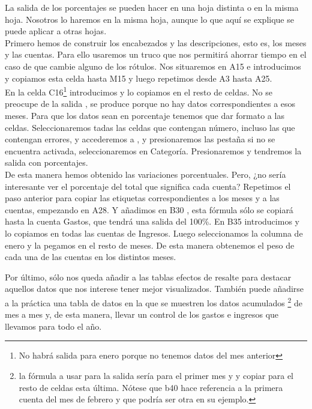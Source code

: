La salida de los porcentajes se pueden hacer en una hoja distinta o en la misma
hoja. Nosotros lo haremos en la misma hoja, aunque lo que aquí se explique se
puede aplicar a otras hojas.\\
Primero hemos de construir los encabezados y las descripciones, esto es, los
meses y las cuentas. Para ello usaremos un truco que nos permitirá ahorrar
tiempo en el caso de que cambie alguno de los rótulos. Nos situaremos en A15
e introducimos  y copiamos esta celda hasta M15 y luego repetimos
desde A3 hasta A25.\\
En la celda C16\footnote{No habrá salida para enero porque no tenemos datos
del mes anterior} introducimos  y lo copiamos en el resto
de celdas. No se preocupe de la salida , se produce porque no
hay datos correspondientes a esos meses. Para que los datos sean en porcentaje
tenemos que dar formato a las celdas. Seleccionaremos tadas las celdas que
contengan número, incluso las que contengan errores, y accederemos a
,  y presionaremos las pestaña  si no
se encuentra activada, seleccionaremos  en Categoría.
Presionaremos  y tendremos la salida con porcentajes.\\
De esta manera hemos obtenido las variaciones porcentuales. Pero, ¿no sería
interesante ver el porcentaje del total que significa cada cuenta?
Repetimos el paso anterior para copiar las etiquetas correspondientes a los
meses y a las cuentas, empezando en A28. Y añadimos en B30 , esta fórmula sólo se copiará hasta la cuenta Gastos, que tendrá una
salida del 100\%. En B35 introducimos  y lo copiamos en
todas las cuentas de Ingresos. Luego seleccionamos la columna de enero y la
pegamos en el resto de meses. De esta manera obtenemos el peso de cada una
de las cuentas en los distintos meses.

Por último, sólo nos queda añadir a las tablas efectos de resalte para destacar
aquellos datos que nos interese tener mejor visualizados. También puede
añadirse a la práctica una tabla de datos en la que se muestren los datos
acumulados \footnote{la fórmula a usar para la salida sería  para
el primer mes y  y copiar para el resto de celdas esta última.
Nótese que b40 hace referencia a la primera cuenta del mes de febrero y que
podría ser otra en su ejemplo.} de mes a mes y, de esta manera, llevar un
control de los gastos e ingresos que llevamos para todo el año.

